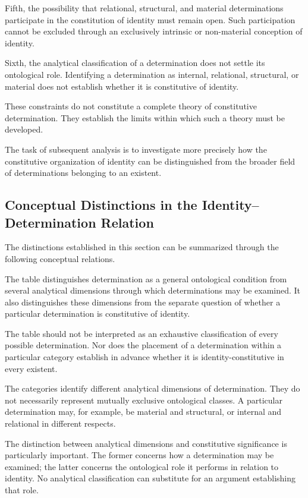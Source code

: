Fifth, the possibility that relational, structural, and
material determinations participate in the constitution
of identity must remain open. Such participation cannot
be excluded through an exclusively intrinsic or
non-material conception of identity.

Sixth, the analytical classification of a determination
does not settle its ontological role. Identifying a
determination as internal, relational, structural, or
material does not establish whether it is constitutive
of identity.

These constraints do not constitute a complete theory
of constitutive determination. They establish the limits
within which such a theory must be developed.

The task of subsequent analysis is to investigate more
precisely how the constitutive organization of identity
can be distinguished from the broader field of
determinations belonging to an existent.

\subsection{Conceptual Distinctions in the Identity--Determination Relation}

The distinctions established in this section can be
summarized through the following conceptual relations.

The table distinguishes determination as a general
ontological condition from several analytical dimensions
through which determinations may be examined. It also
distinguishes these dimensions from the separate question
of whether a particular determination is constitutive
of identity.



The table should not be interpreted as an exhaustive
classification of every possible determination. Nor
does the placement of a determination within a particular
category establish in advance whether it is
identity-constitutive in every existent.

The categories identify different analytical dimensions
of determination. They do not necessarily represent
mutually exclusive ontological classes. A particular
determination may, for example, be material and
structural, or internal and relational in different
respects.

The distinction between analytical dimensions and
constitutive significance is particularly important.
The former concerns how a determination may be examined;
the latter concerns the ontological role it performs
in relation to identity. No analytical classification
can substitute for an argument establishing that role.

